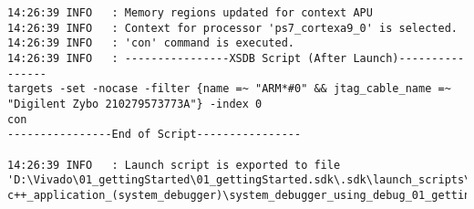 \begin{lstlisting}
14:26:39 INFO	: Memory regions updated for context APU
14:26:39 INFO	: Context for processor 'ps7_cortexa9_0' is selected.
14:26:39 INFO	: 'con' command is executed.
14:26:39 INFO	: ----------------XSDB Script (After Launch)----------------
targets -set -nocase -filter {name =~ "ARM*#0" && jtag_cable_name =~ "Digilent Zybo 210279573773A"} -index 0
con
----------------End of Script----------------

14:26:39 INFO	: Launch script is exported to file 'D:\Vivado\01_gettingStarted\01_gettingStarted.sdk\.sdk\launch_scripts\xilinx_c-c++_application_(system_debugger)\system_debugger_using_debug_01_gettingstarted_applicationproject.elf_on_local.tcl'
\end{lstlisting}







